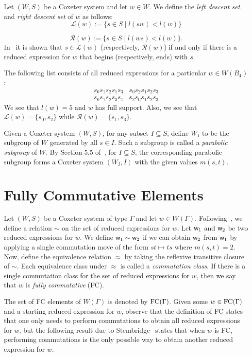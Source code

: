 Let $(W,S)$ be a Coxeter system and let $w \in W$. We define the \emph{left descent set} and \emph{right descent set} of $w$ as follows:
\[\mathcal{L}(w):=\{s \in S \mid l(sw) < l(w)\}\]

\[\mathcal{R}(w):=\{s \in S \mid l(ws) < l(w)\}.\]
In~\cite{Bjorner2005} it is shown that $s \in \mathcal{L}(w)$ (respectively, $\mathcal{R}(w)$) if and only if there is a reduced expression for $w$ that begins (respectively, ends) with $s$.

\begin{example}
The following list consists of all reduced expressions for a particular $w \in W(B_4)$:
$$\begin{array}{ll}
s_0s_1s_2s_1s_3 & s_0s_2s_1s_2s_3\\
s_0s_1s_2s_3s_1 & s_2s_0s_1s_2s_3	
\end{array}$$
We see that $l(w)=5$ and $w$ has full support. Also, we see that $\mathcal{L}(w)=\{s_0, s_2\}$ while $\mathcal{R}(w)=\{s_1, s_3\}$.	
\end{example}

Given a Coxeter system $(W,S)$, for any subset $I \subseteq S$, define $W_I$ to be the subgroup of $W$ generated by all $s \in I$. Such a subgroup is called a \emph{parabolic subgroup} of $W$. By Section 5.5 of~\cite{Humphreys1990}, for $I \subseteq S$, the corresponding parabolic subgroup forms a Coxeter system $(W_I,I)$ with the given values $m(s,t)$.


\section{Fully Commutative Elements}\label{sec:FC}
Let $(W,S)$ be a Coxeter system of type $\Gamma$ and let $w \in W(\Gamma)$. Following~\cite{Stembridge1996}, we define a relation $\sim$ on the set of reduced expressions for $w$. Let $\mathsf{w}_1$ and $\mathsf{w}_2$ be two reduced expressions for $w$. We define $\mathsf{w}_1 \sim \mathsf{w}_2$ if we can obtain $\mathsf{w}_2$ from $\mathsf{w}_1$ by applying a single commutation move of the form $st \mapsto ts$ where $m(s,t)=2$. Now, define the equivalence relation $\approx$ by taking the reflexive transitive closure of $\sim$. Each equivalence class under $\approx$ is called a \emph{commutation class}. If there is a single commutation class for the set of reduced expressions for $w$, then we say that $w$ is \emph{fully commutative} (FC). 

The set of FC elements of $W(\Gamma)$ is denoted by $\mathrm{FC}(\Gamma)$. Given some $w \in \mathrm{FC}(\Gamma)$ and a starting reduced expression for $w$, observe that the definition of FC states that one only needs to perform commutations to obtain all reduced expressions for $w$, but the following result due to Stembridge~\cite{Stembridge1996} states that when $w$ is FC, performing commutations is the only possible way to obtain another reduced expression for $w$.

